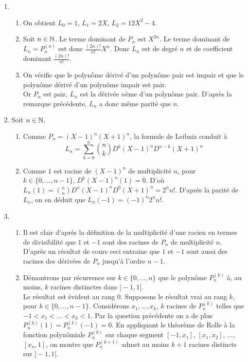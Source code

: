 \begin{enumerate}
\item 
\begin{enumerate}
\item On obtient $L_0=1$, $L_1=2X$, $L_2=12X^2-4$.
\item Soit $n\in\mathbb{N}$. Le terme dominant de $P_n$ est $X^{2n}$. Le terme dominant de $L_n=P_n^{(n)}$ est donc $\frac{(2n)!}{n!}X^n$. Donc $L_n$ est de degré $n$ et de coefficient dominant $\frac{(2n)!}{n!}$.
\item On vérifie que le polynôme dérivé d'un polynôme pair est impair et que le polynôme dérivé d'un polynôme impair est pair.\\
Or $P_n$ est pair,  $L_n$ est la dérivée $n$ème d'un polynôme pair. D'après la remarque précédente, $L_n$ a donc même parité que $n$. 
\end{enumerate}
\item Soit $n\in\mathbb{N}$.
\begin{enumerate} 
\item Comme $P_n=(X-1)^n(X+1)^n$, la formule de Leibniz conduit à
\begin{displaymath}
 L_n=\sum_{k=0}^{n}\binom{n}{k}D^k(X-1)^nD^{n-k}(X+1)^n
\end{displaymath}
\item Comme $1$ est racine de $(X-1)^n$ de multiplicité $n$, pour $k\in\{0,\dots,n-1\}$, $D^k(X-1)^n(1)=0$. D'où $L_n(1)=\binom{n}{n}D^n(X-1)^nD^{0}(X+1)^n=2^nn!$. D'après la parité de $L_n$, on en déduit que $L_n(-1)=(-1)^n2^nn!$.
\end{enumerate}
\item \begin{enumerate}
\item Il est clair d'après la définition de la multiplicité d'une racien en termes de divisibilité que $1$ et $-1$ sont des racines de $P_n$ de multiplicité $n$. D'après un résultat de cours ceci entraine que $1$ et $-1$ sont aussi des racines des dérivées de $P_n$ jusqu'à l'ordre $n-1$.
\item Démontrons par récurrence sur $k\in \{0,\dots,n\}$ que le polynôme $P_n^{(k)}$ à, au moins, $k$ racines distinctes dans $]-1,1[$.\\
Le résultat est évident au rang 0. Supposons le résultat vrai au rang $k$, pour $k\in \{0,\dots,n-1\}$. Considérons  $x_1,\dots, x_k$, $k$ racines de $P_n^{(k)}$ telles que $-1<x_1<\dots<x_k<1$. Par la question précédente on a de plus $P_n^{(k)}(1)=P_n^{(k)}(-1)=0$.
En appliquant le théorème de Rolle à la fonction polynômiale $P_n^{(k)}$ sur chaque segment $[-1,x_1]$, $[x_1,x_2]$, $\dots$, $[x_n,1]$, on montre que $P_n^{(k+1)}$ admet au moins $k+1$ racines distincts sur $]-1,1[$.\\

\end{enumerate}
\end{enumerate}
